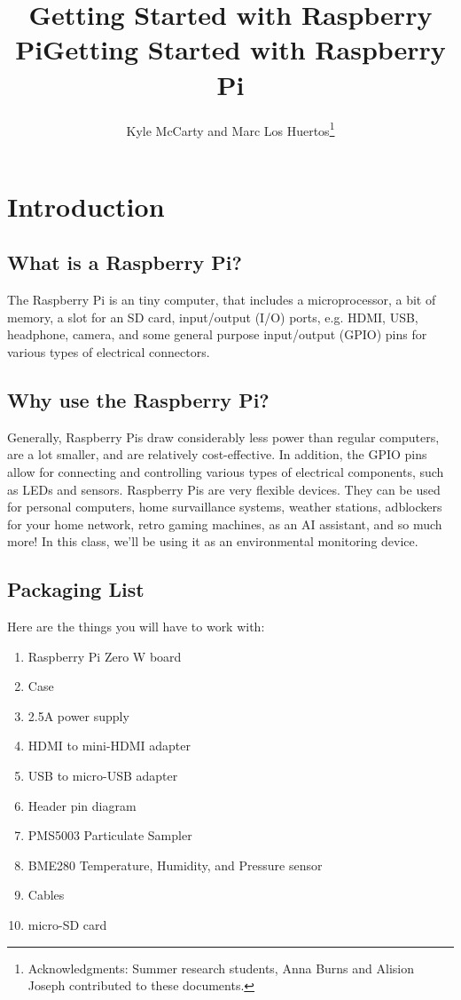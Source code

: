 \documentclass{article}
\title{Getting Started with Raspberry Pi}
\author{Kyle McCarty and Marc Los Huertos\footnote{Acknowledgments: Summer research students, Anna Burns and Alision Joseph contributed to these documents.}}
\title{Getting Started with Raspberry Pi}
\begin{document}
\maketitle

\newpage

\tableofcontents

\newpage

\section{Introduction}

\subsection{What is a Raspberry Pi?}

The Raspberry Pi is an tiny computer, that includes a microprocessor, a bit of memory, a slot for an SD card, input/output (I/O) ports, e.g. HDMI, USB, headphone, camera, and some general purpose input/output (GPIO) pins for various types of electrical connectors.

\subsection{Why use the Raspberry Pi?}

Generally, Raspberry Pis draw considerably less power than regular computers, are a lot smaller, and are relatively cost-effective. In addition, the GPIO pins allow for connecting and controlling various types of electrical components, such as LEDs and sensors. Raspberry Pis are very flexible devices. They can be used for personal computers, home survaillance systems, weather stations, adblockers for your home network, retro gaming machines, as an AI assistant, and so much more! In this class, we'll be using it as an environmental monitoring device.

\subsection{Packaging List}

Here are the things you will have to work with: 

\begin{enumerate}[noitemsep]
  \item Raspberry Pi Zero W board
  \item Case
  \item 2.5A power supply
  \item HDMI to mini-HDMI adapter
  \item USB to micro-USB adapter
  \item Header pin diagram
  \item PMS5003 Particulate Sampler
  \item BME280 Temperature, Humidity, and Pressure sensor
  \item Cables
  \item micro-SD card
\end{enumerate}
\end{document}
